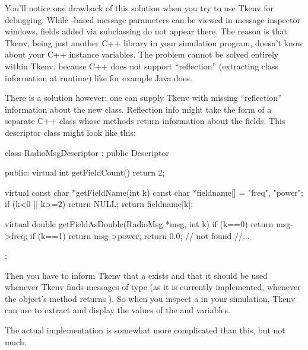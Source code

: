 
You'll notice one drawback of this solution when you try to use
Tkenv for debugging. While -based message parameters can be viewed in
message inspector windows, fields added via subclassing do not appear
there. The reason is that Tkenv, being just another C++ library in your
simulation program, doesn't know about your C++ instance variables.
The problem cannot be solved entirely within Tkenv, because C++ does not
support ``reflection'' (extracting class information at runtime)
like for example Java does.

There is a solution however: one can supply Tkenv with missing ``reflection''
information about the new class. Reflection info might take the form of
a separate C++ class whose methods return information about the
 fields. This descriptor class might look like this:

\begin{cpp}
class RadioMsgDescriptor : public Descriptor
{
  public:
    virtual int getFieldCount() {return 2;}

    virtual const char *getFieldName(int k) {
        const char *fieldname[] = {"freq", "power";}
        if (k<0 || k>=2) return NULL;
        return fieldname[k];
    }

    virtual double getFieldAsDouble(RadioMsg *msg, int k) {
        if (k==0) return msg->freq;
        if (k==1) return msg->power;
        return 0.0; // not found
    }
    //...
};
\end{cpp}

Then you have to inform Tkenv that a  exists and that it
should be used whenever Tkenv finds messages of type  (as it is
currently implemented, whenever the object's  method returns
). So when you inspect a  in your simulation, Tkenv
can use  to extract and display the values of
the  and  variables.

The actual implementation is somewhat more complicated than this, but not
much.

